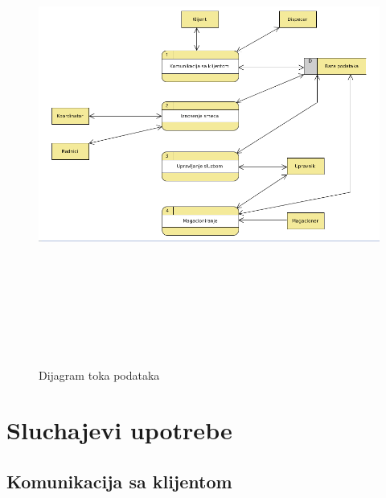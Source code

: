 \documentclass[10 pt]{article}
\begin{document}
	\begin{figure}[H]
		\centering
		\includegraphics[width=15cm,height=15cm,keepaspectratio]{slike/DTP.png}\\
		\caption{Dijagram toka podataka	\label{fig:dijagramTokaPodataka}}
	\end{figure}
	
\section{Sluchajevi upotrebe}


	\subsection{Komunikacija sa klijentom}
	
\end{document}
